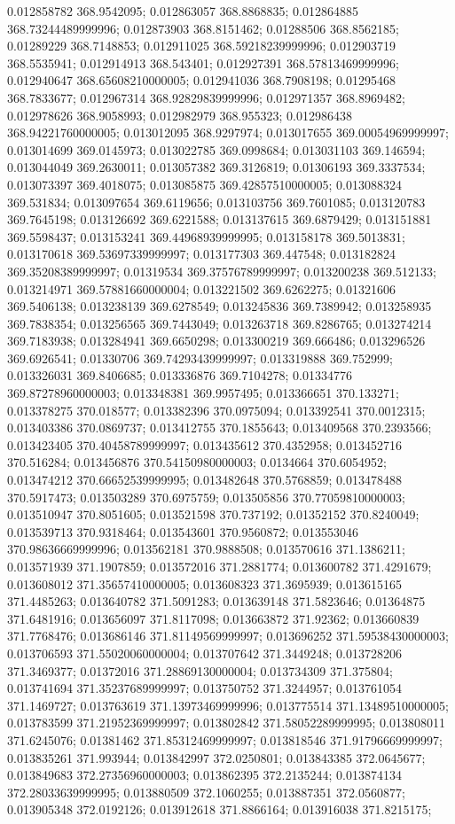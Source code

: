 0.012858782 368.9542095; 0.012863057 368.8868835; 0.012864885 368.73244489999996; 0.012873903 368.8151462; 0.01288506 368.8562185; 0.01289229 368.7148853; 0.012911025 368.59218239999996; 0.012903719 368.5535941; 0.012914913 368.543401; 0.012927391 368.57813469999996; 0.012940647 368.65608210000005; 0.012941036 368.7908198; 0.01295468 368.7833677; 0.012967314 368.92829839999996; 0.012971357 368.8969482; 0.012978626 368.9058993; 0.012982979 368.955323; 0.012986438 368.94221760000005; 0.013012095 368.9297974; 0.013017655 369.00054969999997; 0.013014699 369.0145973; 0.013022785 369.0998684; 0.013031103 369.146594; 0.013044049 369.2630011; 0.013057382 369.3126819; 0.01306193 369.3337534; 0.013073397 369.4018075; 0.013085875 369.42857510000005; 0.013088324 369.531834; 0.013097654 369.6119656; 0.013103756 369.7601085; 0.013120783 369.7645198; 0.013126692 369.6221588; 0.013137615 369.6879429; 0.013151881 369.5598437; 0.013153241 369.44968939999995; 0.013158178 369.5013831; 0.013170618 369.53697339999997; 0.013177303 369.447548; 0.013182824 369.35208389999997; 0.01319534 369.37576789999997; 0.013200238 369.512133; 0.013214971 369.57881660000004; 0.013221502 369.6262275; 0.01321606 369.5406138; 0.013238139 369.6278549; 0.013245836 369.7389942; 0.013258935 369.7838354; 0.013256565 369.7443049; 0.013263718 369.8286765; 0.013274214 369.7183938; 0.013284941 369.6650298; 0.013300219 369.666486; 0.013296526 369.6926541; 0.01330706 369.74293439999997; 0.013319888 369.752999; 0.013326031 369.8406685; 0.013336876 369.7104278; 0.01334776 369.87278960000003; 0.013348381 369.9957495; 0.013366651 370.133271; 0.013378275 370.018577; 0.013382396 370.0975094; 0.013392541 370.0012315; 0.013403386 370.0869737; 0.013412755 370.1855643; 0.013409568 370.2393566; 0.013423405 370.40458789999997; 0.013435612 370.4352958; 0.013452716 370.516284; 0.013456876 370.54150980000003; 0.0134664 370.6054952; 0.013474212 370.66652539999995; 0.013482648 370.5768859; 0.013478488 370.5917473; 0.013503289 370.6975759; 0.013505856 370.77059810000003; 0.013510947 370.8051605; 0.013521598 370.737192; 0.01352152 370.8240049; 0.013539713 370.9318464; 0.013543601 370.9560872; 0.013553046 370.98636669999996; 0.013562181 370.9888508; 0.013570616 371.1386211; 0.013571939 371.1907859; 0.013572016 371.2881774; 0.013600782 371.4291679; 0.013608012 371.35657410000005; 0.013608323 371.3695939; 0.013615165 371.4485263; 0.013640782 371.5091283; 0.013639148 371.5823646; 0.01364875 371.6481916; 0.013656097 371.8117098; 0.013663872 371.92362; 0.013660839 371.7768476; 0.013686146 371.81149569999997; 0.013696252 371.59538430000003; 0.013706593 371.55020060000004; 0.013707642 371.3449248; 0.013728206 371.3469377; 0.01372016 371.28869130000004; 0.013734309 371.375804; 0.013741694 371.35237689999997; 0.013750752 371.3244957; 0.013761054 371.1469727; 0.013763619 371.13973469999996; 0.013775514 371.13489510000005; 0.013783599 371.21952369999997; 0.013802842 371.58052289999995; 0.013808011 371.6245076; 0.01381462 371.85312469999997; 0.013818546 371.91796669999997; 0.013835261 371.993944; 0.013842997 372.0250801; 0.013843385 372.0645677; 0.013849683 372.27356960000003; 0.013862395 372.2135244; 0.013874134 372.28033639999995; 0.013880509 372.1060255; 0.013887351 372.0560877; 0.013905348 372.0192126; 0.013912618 371.8866164; 0.013916038 371.8215175; 